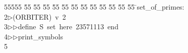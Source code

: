 %
%
\begin{tabbing}
55555 \= 55 \= 55 \= 55 \= 55 \= 55 \= 55 \= 55 \= 55 \= 55 \= 55 \= 55 \= 55 \= \>set\_of\_primes:\\[0pt]
2\>$\triangleright$\>(ORBITER)\ v\ 2\ \\[0pt]
3\>$\triangleright$\>$\triangleright$\>define\ S\ set\ here\ 23571113\ end\ \\[0pt]
4\>$\triangleright$\>$\triangleright$\>print\_symbols\\[0pt]
5\>\end{tabbing}
